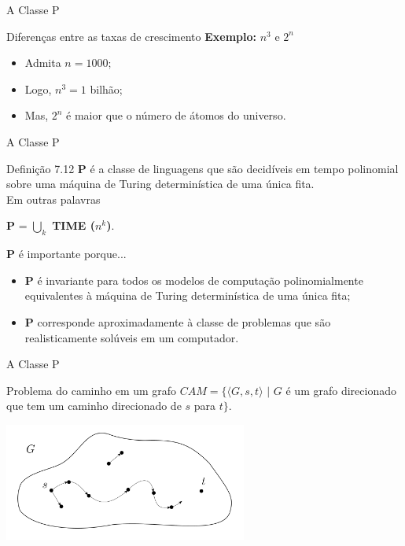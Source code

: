 \documentclass[xcolor=dvipsnames,table]{beamer}
\begin{document}
	\begin{frame}{A Classe P}
		\begin{block}{Diferenças entre as taxas de crescimento}
			{\bf Exemplo:} $n^3$ e $2^n$ \pause
			\begin{itemize}
				\item Admita $n = 1000$; \pause
				\item Logo, $n^3 = 1$ bilhão; \pause
				\item Mas, $2^n$ é maior que o número de átomos do universo.
			\end{itemize}
		\end{block}
	\end{frame}
	
	\begin{frame}{A Classe P}
		\begin{block}{Definição 7.12}
			{\bf P} é a classe de linguagens que são decidíveis em tempo polinomial sobre uma máquina de Turing determinística de uma única fita. \\Em outras palavras
			\begin{center}
				{\bf P} = $\bigcup\limits_{k}$ {\bf TIME ($n^k$)}.
			\end{center}
		\end{block} \pause
		\begin{block}{{\bf P} é importante porque...} \pause
			\begin{itemize} 
				\item {\bf P} é invariante para todos os modelos de computação polinomialmente equivalentes à máquina de Turing determinística de uma única fita; \pause
				\item {\bf P} corresponde aproximadamente à classe de problemas que são realisticamente solúveis em um computador.
			\end{itemize}
		\end{block}
	\end{frame}
	
	\begin{frame}{A Classe P}
		\begin{block}{Problema do caminho em um grafo}
			$CAM = \{ \langle G, s, t \rangle \mbox{ | } G$ é um grafo direcionado que tem um caminho direcionado de $s$ para $t \}$.
		\end{block} \pause
		\begin{center}
			\includegraphics[width=8cm]{images/cam.png}
		\end{center}
	\end{frame}
	
\end{document}
